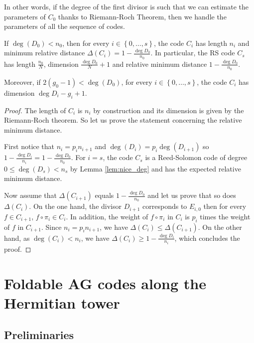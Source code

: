 \documentclass[a4paper,USenglish,autoref]{lipics-v2021}
\newcommand{\set}[1]{\left\{#1\right\}}
\newcommand{\Range}[2]{\set{#1,\dots,#2}}
\begin{document}
In other words, if the degree of the first divisor is such that we can estimate the parameters of $C_0$ thanks to Riemann-Roch Theorem, then we handle the parameters of all the sequence of codes.

\begin{proposition}\label{prop:dist_min_Kummer}
	If $\deg(D_0) < n_0$, then for every $i \in \Range{0}{s}$, the code $C_i$ has length $n_i$ and minimum relative distance $\Delta(C_i)=1- \frac{\deg D_0}{n_0}$. In particular, the RS code $C_s$ has length $\frac{n_0}{N}$, dimension $\frac{\deg D_0}{N} + 1$ and relative minimum distance $1- \frac{\deg D_0}{n_0}$.
	
	Moreover, if $2(g_0-1) < \deg(D_0)$, for every $i \in \Range{0}{s}$, the code $C_i$ has dimension $\deg D_i -g_i +1$.
\end{proposition}

\begin{proof}
	The length of $C_i$ is $n_i$ by construction and its dimension is given by the Riemann-Roch theorem. So let us prove the statement concerning the relative minimum distance.
	
	First notice that $n_i=p_i n_{i+1}$  and $\deg(D_i)=p_i \deg(D_{i+1})$ so $1- \frac{\deg D_i}{n_i}=1- \frac{\deg D_0}{n_0}$. 
	For $i=s$, the code $C_s$ is a Reed-Solomon code of degree $0 \leq \deg(D_s) < n_s$ by Lemma \ref{lem:nice_deg} and has the expected relative minimum distance.
	
	Now assume that $\Delta(C_{i+1})$ equals $1- \frac{\deg D_{0}}{n_{0}}$ and let us prove that so does $\Delta(C_i)$. 
	On the one hand, the divisor $D_{i+1}$ corresponds to $E_{i,0}$ then for every $f \in C_{i+1}$, $f \circ \pi_i \in C_i$. In addition, the weight of $f \circ \pi_i$ in $C_i$ is $p_i$ times the weight of $f$ in $C_{i+1}$. Since $n_i=p_i n_{i+1}$, we have $\Delta(C_i) \leq \Delta(C_{i+1})$. On the other hand, as $\deg(C_i) < n_i$, we have $\Delta(C_i) \geq 1- \frac{\deg{D_i}}{n_i}$, which concludes the proof. 
\end{proof}



\section{Foldable AG codes along the Hermitian tower}\label{subsec:HermitianTower}

\subsection{Preliminaries}
\end{document}
